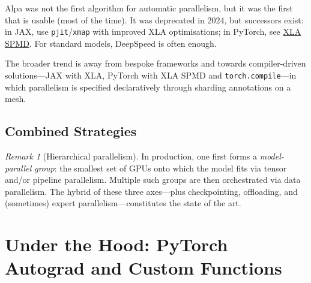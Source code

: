 \documentclass[11pt,a4paper]{article}
\theoremstyle{definition}
\theoremstyle{remark}
\newtheorem*{remark}{Remark}
\theoremstyle{plain}
\begin{document}
\begin{center}
\end{center}

Alpa was not the first algorithm for automatic parallelism, but it was
the first that is usable (most of the time). It was deprecated in 2024,
but successors exist: in JAX, use \texttt{pjit}/\texttt{xmap} with
improved XLA optimisations; in PyTorch, see
\href{https://docs.pytorch.org/xla/master/spmd.html}{XLA SPMD}. For
standard models, DeepSpeed is often enough.

The broader trend is away from bespoke frameworks and towards
compiler-driven solutions---JAX with XLA, PyTorch with XLA SPMD and
\texttt{torch.compile}---in which parallelism is specified declaratively
through sharding annotations on a mesh.

\subsection{Combined Strategies}

\begin{remark}[Hierarchical parallelism]
In production, one first forms a \emph{model-parallel group}: the
smallest set of GPUs onto which the model fits via tensor and/or pipeline
parallelism. Multiple such groups are then orchestrated via data
parallelism. The hybrid of these three axes---plus checkpointing,
offloading, and (sometimes) expert parallelism---constitutes the state of
the art.
\end{remark}

\section{Under the Hood: PyTorch Autograd and Custom Functions}
\label{sec:autograd}
\end{document}
